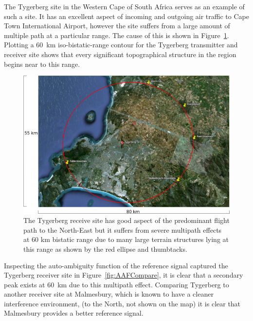 \documentclass[english, 12pt]{report}
\begin{document}
The Tygerberg site in the Western Cape of South Africa serves as an example of such a site. It has an excellent aspect of incoming and outgoing air traffic to Cape Town International Airport, however the site suffers from a large amount of multiple path at a particular range. The cause of this is shown in Figure~\ref{fig:TygerbergMulipathStructures}. Plotting a 60~km iso-bistatic-range contour for the Tygerberg transmitter and receiver site shows that every significant topographical structure in the region begins near to this range.

\begin{figure}[ht]
\centering
\includegraphics[width=1\columnwidth]{figs/60kmMultipath.png}
\caption[The Tygerberg receive site with multipath]{The Tygerberg receive site has good aspect of the predominant flight path to the North-East but it suffers from severe multipath effects at 60 km bistatic range due to many large terrain structures lying at this range as shown by the red ellipse and thumbtacks.}
\label{fig:TygerbergMulipathStructures}
\end{figure}

Inspecting the auto-ambiguity function of the reference signal captured the Tygerberg receiver site in Figure~\ref{fig:AAFCompare}, it is clear that a secondary peak exists at 60~km due to this multipath effect. Comparing Tygerberg to another receiver site at Malmesbury, which is known to have a cleaner interference environment, (to the North, not shown on the map) it is clear that Malmesbury provides a better reference signal.
\end{document}
